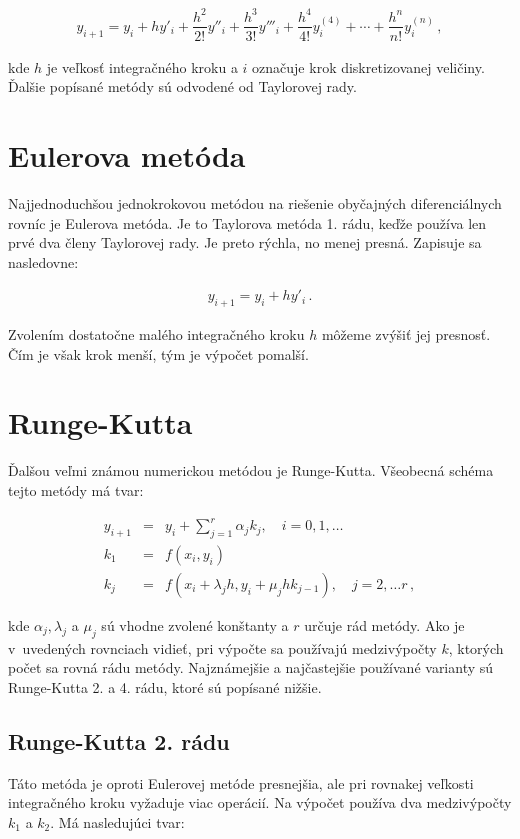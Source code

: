 \begin{eqnarray}
y_{i + 1} = y_{i} + h y'_{i} + \dfrac{h^{2}}{2!}y''_{i} + \dfrac{h^{3}}{3!}y'''_{i} + \dfrac{h^{4}}{4!}y^{(4)}_{i} + \cdots + \dfrac{h^{n}}{n!}y_{i}^{(n)} \, , \label{Taylor}
\end{eqnarray}

kde $ h $ je veľkosť integračného kroku a $ i $ označuje krok diskretizovanej veličiny. Ďalšie popísané metódy sú odvodené od Taylorovej rady.


\section{Eulerova metóda}
Najjednoduchšou jednokrokovou metódou na riešenie obyčajných diferenciálnych rovníc je Eulerova metóda. Je to Taylorova metóda 1. rádu, keďže používa len prvé dva členy Taylorovej rady. Je preto rýchla, no menej presná. Zapisuje sa nasledovne:

\begin{eqnarray}
y_{i+1} = y_{i} + hy'_{i} \, .
\end{eqnarray}

Zvolením dostatočne malého integračného kroku $ h $ môžeme zvýšiť jej presnosť. Čím je však krok menší, tým je výpočet pomalší.


\section{Runge-Kutta}
Ďalšou veľmi známou numerickou metódou je Runge-Kutta. Všeobecná schéma tejto metódy má tvar:

\begin{eqnarray}
y_{i+1} & = & y_{i} + \sum^{r}_{j=1} \alpha_{j}k_{j} , \quad i=0, 1,\dotsc \\
k_{1} & = & f(x_{i},y_{i}) \nonumber \\
k_{j} & = & f(x_{i} + \lambda_{j}h, y_{i} + \mu_{j}hk_{j-1}) , \quad j=2,\dotsc r \, , \nonumber
\end{eqnarray}

kde $\alpha_{j}, \lambda_{j}$ a $\mu_{j}$ sú vhodne zvolené konštanty a $ r $ určuje rád metódy. Ako je v~uvedených rovnciach vidieť, pri výpočte sa používajú medzivýpočty $ k $, ktorých počet sa rovná rádu metódy.
Najznámejšie a najčastejšie používané varianty sú Runge-Kutta 2. a 4. rádu, ktoré sú popísané nižšie.

\subsection{Runge-Kutta 2. rádu} \label{RK2}
Táto metóda je oproti Eulerovej metóde presnejšia, ale pri rovnakej veľkosti integračného kroku vyžaduje viac operácií. Na výpočet používa dva medzivýpočty $ k_{1} $ a $ k_{2} $. Má nasledujúci tvar:

